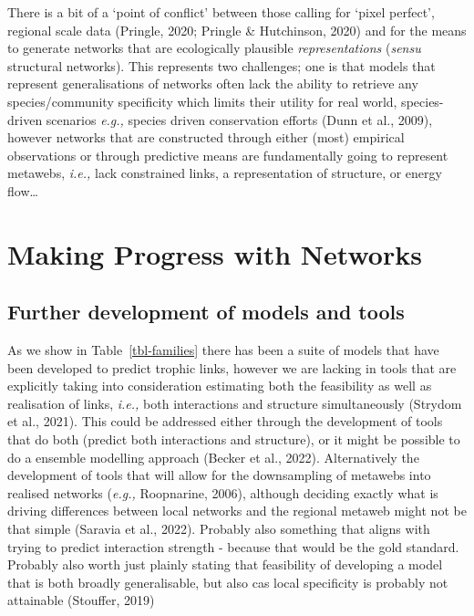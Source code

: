 \documentclass[
]{article}
\begin{document}
There is a bit of a `point of conflict' between those calling for `pixel
perfect', regional scale data (Pringle, 2020; Pringle \& Hutchinson,
2020) and for the means to generate networks that are ecologically
plausible \emph{representations} (\emph{sensu} structural networks).
This represents two challenges; one is that models that represent
generalisations of networks often lack the ability to retrieve any
species/community specificity which limits their utility for real world,
species-driven scenarios \emph{e.g.,} species driven conservation
efforts (Dunn et al., 2009), however networks that are constructed
through either (most) empirical observations or through predictive means
are fundamentally going to represent metawebs, \emph{i.e.,} lack
constrained links, a representation of structure, or energy flow\ldots{}

\section{Making Progress with
Networks}\label{making-progress-with-networks}

\subsection{Further development of models and
tools}\label{further-development-of-models-and-tools}

As we show in Table~\ref{tbl-families} there has been a suite of models
that have been developed to predict trophic links, however we are
lacking in tools that are explicitly taking into consideration
estimating both the feasibility as well as realisation of links,
\emph{i.e.,} both interactions and structure simultaneously (Strydom et
al., 2021). This could be addressed either through the development of
tools that do both (predict both interactions and structure), or it
might be possible to do a ensemble modelling approach (Becker et al.,
2022). Alternatively the development of tools that will allow for the
downsampling of metawebs into realised networks (\emph{e.g.,}
Roopnarine, 2006), although deciding exactly what is driving differences
between local networks and the regional metaweb might not be that simple
(Saravia et al., 2022). Probably also something that aligns with trying
to predict interaction strength - because that would be the gold
standard. Probably also worth just plainly stating that feasibility of
developing a model that is both broadly generalisable, but also cas
local specificity is probably not attainable (Stouffer, 2019)
\end{document}
